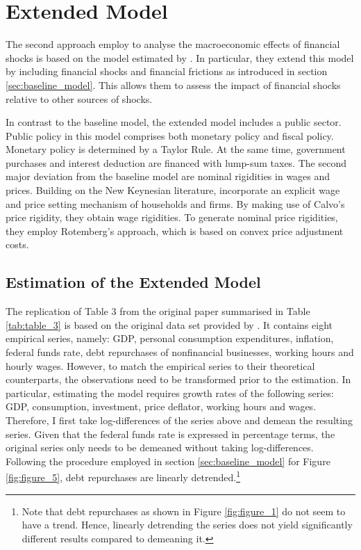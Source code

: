 \section{Extended Model}
\label{sec:extended_model}

The second approach \citeauthor{JERMANNfinancial} employ to analyse the macroeconomic effects of financial shocks is based on the model estimated by \citet{SMETSshocks}. In particular, they extend this model by including financial shocks and financial frictions as introduced in section \ref{sec:baseline_model}. This allows them to assess the impact of financial shocks relative to other sources of shocks. 

In contrast to the baseline model, the extended model includes a public sector. Public policy in this model comprises both monetary policy and fiscal policy. Monetary policy is determined by a Taylor Rule. At the same time, government purchases and interest deduction are financed with lump-sum taxes. The second major deviation from the baseline model are nominal rigidities in wages and prices. Building on the New Keynesian literature, \citeauthor{JERMANNfinancial} incorporate an explicit wage and price setting mechanism of households and firms. By making use of Calvo's price rigidity, they obtain wage rigidities. To generate nominal price rigidities, they employ Rotemberg's approach, which is based on convex price adjustment costs.


\subsection{Estimation of the Extended Model}
\label{sec:extended_model_estimation}



The replication of Table 3 from the original paper summarised in Table \ref{tab:table_3} is based on the original data set provided by \citeauthor{JERMANNfinancial}. It contains eight empirical series, namely: GDP, personal consumption expenditures, inflation, federal funds rate, debt repurchases of nonfinancial businesses, working hours and hourly wages. However, to match the empirical series to their theoretical counterparts, the observations need to be transformed prior to the estimation. In particular, estimating the model requires growth rates of the following series: GDP, consumption, investment, price deflator, working hours and wages. Therefore, I first take log-differences of the series above and demean the resulting series. Given that the federal funds rate is expressed in percentage terms, the original series only needs to be demeaned without taking log-differences. Following the procedure employed in section \ref{sec:baseline_model} for Figure \ref{fig:figure_5}, debt repurchases are linearly detrended.\footnote{Note that debt repurchases as shown in Figure \ref{fig:figure_1} do not seem to have a trend. Hence, linearly detrending the series does not yield significantly different results compared to demeaning it.}

